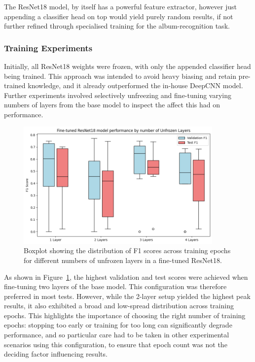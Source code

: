                 The ResNet18 model, by itself has a powerful feature extractor, however just appending a classifier head on top would yield purely random results, if not further refined through specialised training for the album-recognition task.
    
                \subsubsection{Training Experiments}
    
                    Initially, all ResNet18 weights were frozen, with only the appended classifier head being trained. This approach was intended to avoid heavy biasing and retain pre-trained knowledge, and it already outperformed the in-house DeepCNN model. Further experiments involved selectively unfreezing and fine-tuning varying numbers of layers from the base model to inspect the affect this had on performance.
    
                    \begin{figure}
                        \centering
                        \includegraphics[width=0.9\textwidth]{images/ResNetLayerTests.png}
                        \caption{Boxplot showing the distribution of F1 scores across training epochs for different numbers of unfrozen layers in a fine-tuned ResNet18.} \label{fig:ResNetLayers}
                    \end{figure}
                    
                    As shown in Figure~\ref{fig:ResNetLayers}, the highest validation and test scores were achieved when fine-tuning two layers of the base model. This configuration was therefore preferred in most tests. However, while the 2-layer setup yielded the highest peak results, it also exhibited a broad and low-spread distribution across training epochs. This highlights the importance of choosing the right number of training epochs: stopping too early or training for too long can significantly degrade performance, and so particular care had to be taken in other experimental scenarios using this configuration, to ensure that epoch count was not the deciding factor influencing results.
        

